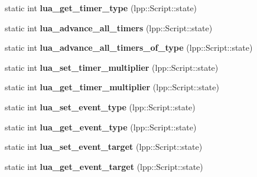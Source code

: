 \begin{DoxyCompactItemize}
\item 
static int {\bfseries lua\+\_\+get\+\_\+timer\+\_\+type} (lpp\+::\+Script\+::state)\hypertarget{class_lua_interface_acbb769fbc0ff8f0faf5b1def506bab41}{}\label{class_lua_interface_acbb769fbc0ff8f0faf5b1def506bab41}

\item 
static int {\bfseries lua\+\_\+advance\+\_\+all\+\_\+timers} (lpp\+::\+Script\+::state)\hypertarget{class_lua_interface_a4920754882402b60a0327307176971d6}{}\label{class_lua_interface_a4920754882402b60a0327307176971d6}

\item 
static int {\bfseries lua\+\_\+advance\+\_\+all\+\_\+timers\+\_\+of\+\_\+type} (lpp\+::\+Script\+::state)\hypertarget{class_lua_interface_a4d60e78d081e3e5e7dd5defe5d59d213}{}\label{class_lua_interface_a4d60e78d081e3e5e7dd5defe5d59d213}

\item 
static int {\bfseries lua\+\_\+set\+\_\+timer\+\_\+multiplier} (lpp\+::\+Script\+::state)\hypertarget{class_lua_interface_a5fddeb114bbd19c707704c746eff7549}{}\label{class_lua_interface_a5fddeb114bbd19c707704c746eff7549}

\item 
static int {\bfseries lua\+\_\+get\+\_\+timer\+\_\+multiplier} (lpp\+::\+Script\+::state)\hypertarget{class_lua_interface_a72ff27ac4fda2ba21207188d6179a916}{}\label{class_lua_interface_a72ff27ac4fda2ba21207188d6179a916}

\item 
static int {\bfseries lua\+\_\+set\+\_\+event\+\_\+type} (lpp\+::\+Script\+::state)\hypertarget{class_lua_interface_adefc8a0dc0684c598112c00f4d20e015}{}\label{class_lua_interface_adefc8a0dc0684c598112c00f4d20e015}

\item 
static int {\bfseries lua\+\_\+get\+\_\+event\+\_\+type} (lpp\+::\+Script\+::state)\hypertarget{class_lua_interface_ac35a4d6b6350f8cd9b9ca6eabebc8a12}{}\label{class_lua_interface_ac35a4d6b6350f8cd9b9ca6eabebc8a12}

\item 
static int {\bfseries lua\+\_\+set\+\_\+event\+\_\+target} (lpp\+::\+Script\+::state)\hypertarget{class_lua_interface_a9b72fdefdafc1ee8f034e014cc9e7714}{}\label{class_lua_interface_a9b72fdefdafc1ee8f034e014cc9e7714}

\item 
static int {\bfseries lua\+\_\+get\+\_\+event\+\_\+target} (lpp\+::\+Script\+::state)\hypertarget{class_lua_interface_a629912db45db49a5ca77b1948fd818a1}{}\label{class_lua_interface_a629912db45db49a5ca77b1948fd818a1}


\end{DoxyCompactItemize}
